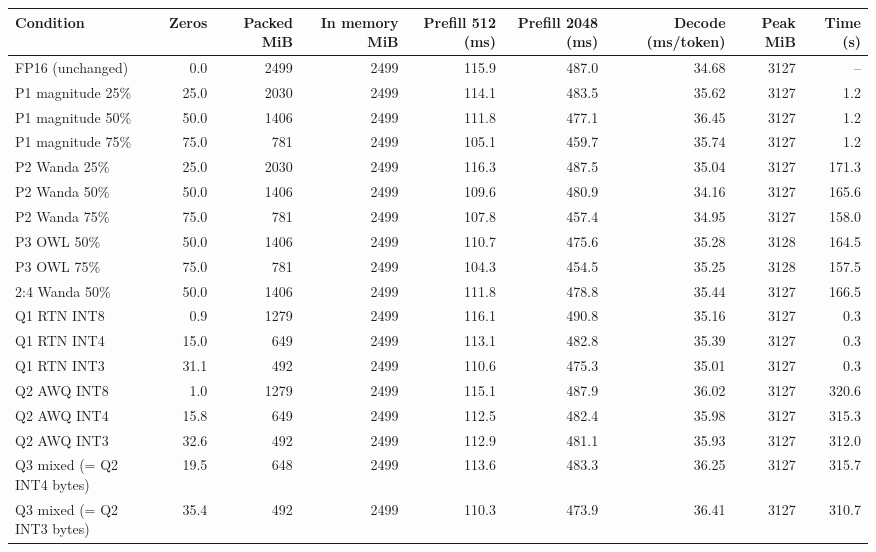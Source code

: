\scriptsize
\setlength{\tabcolsep}{3.5pt}
\label{tab:t1res}
\begin{adjustbox}{max width=\linewidth}
\begin{tabular}{lrrrrrrrr}
\toprule
Condition & Zeros & Packed MiB & In memory MiB & Prefill 512 (ms) & Prefill 2048 (ms) & Decode (ms/token) & Peak MiB & Time (s) \\
\midrule
FP16 (unchanged) & 0.0 & 2499 & 2499 & 115.9 & 487.0 & 34.68 & 3127 & -- \\
P1 magnitude 25\% & 25.0 & 2030 & 2499 & 114.1 & 483.5 & 35.62 & 3127 & 1.2 \\
P1 magnitude 50\% & 50.0 & 1406 & 2499 & 111.8 & 477.1 & 36.45 & 3127 & 1.2 \\
P1 magnitude 75\% & 75.0 & 781 & 2499 & 105.1 & 459.7 & 35.74 & 3127 & 1.2 \\
P2 Wanda 25\% & 25.0 & 2030 & 2499 & 116.3 & 487.5 & 35.04 & 3127 & 171.3 \\
P2 Wanda 50\% & 50.0 & 1406 & 2499 & 109.6 & 480.9 & 34.16 & 3127 & 165.6 \\
P2 Wanda 75\% & 75.0 & 781 & 2499 & 107.8 & 457.4 & 34.95 & 3127 & 158.0 \\
P3 OWL 50\% & 50.0 & 1406 & 2499 & 110.7 & 475.6 & 35.28 & 3128 & 164.5 \\
P3 OWL 75\% & 75.0 & 781 & 2499 & 104.3 & 454.5 & 35.25 & 3128 & 157.5 \\
2:4 Wanda 50\% & 50.0 & 1406 & 2499 & 111.8 & 478.8 & 35.44 & 3127 & 166.5 \\
Q1 RTN INT8 & 0.9 & 1279 & 2499 & 116.1 & 490.8 & 35.16 & 3127 & 0.3 \\
Q1 RTN INT4 & 15.0 & 649 & 2499 & 113.1 & 482.8 & 35.39 & 3127 & 0.3 \\
Q1 RTN INT3 & 31.1 & 492 & 2499 & 110.6 & 475.3 & 35.01 & 3127 & 0.3 \\
Q2 AWQ INT8 & 1.0 & 1279 & 2499 & 115.1 & 487.9 & 36.02 & 3127 & 320.6 \\
Q2 AWQ INT4 & 15.8 & 649 & 2499 & 112.5 & 482.4 & 35.98 & 3127 & 315.3 \\
Q2 AWQ INT3 & 32.6 & 492 & 2499 & 112.9 & 481.1 & 35.93 & 3127 & 312.0 \\
Q3 mixed (= Q2 INT4 bytes) & 19.5 & 648 & 2499 & 113.6 & 483.3 & 36.25 & 3127 & 315.7 \\
Q3 mixed (= Q2 INT3 bytes) & 35.4 & 492 & 2499 & 110.3 & 473.9 & 36.41 & 3127 & 310.7 \\
\bottomrule
\end{tabular}
\end{adjustbox}
